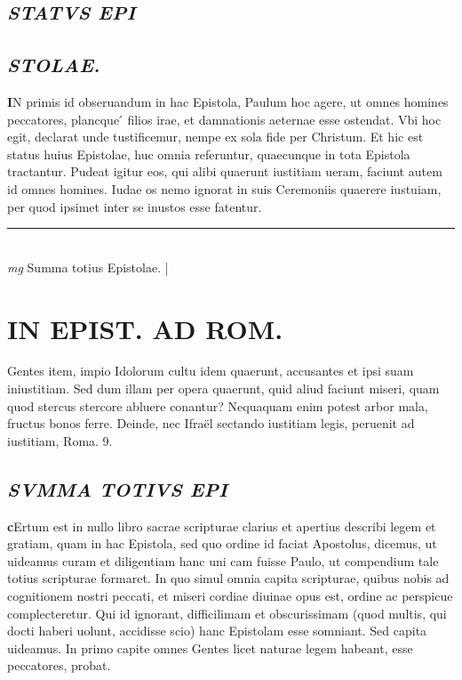 \documentclass{article}
\begin{document}
\begin{pages}
\subsection*{\textit{STATVS EPI}}
{}
\subsection*{\textit{STOLAE.  }}\pstart \huge\textbf{I}\normalsize N primis id obseruandum in hac Epistola, Paulum hoc agere, ut omnes homines peccatores, plancque ́ filios irae, et damnationis aeternae esse ostendat. Vbi hoc egit, declarat unde tustificemur, nempe ex sola fide per Christum. Et hic est status huius Epistolae, huc omnia referuntur, quaecunque in tota Epistola tractantur. Pudeat igitur eos, qui alibi quaerunt iustitiam ueram, faciunt autem id omnes homines. Iudae os nemo ignorat in suis Ceremoniis quaerere iustuiam, per quod ipsimet inter se inustos esse fatentur.  \pend
\vspace{0.5cm}\noindent
\vspace{0.2cm}\rule{1cm}{0.2pt}\\ 
\hspace{0.2cm}\textit{mg}
\footnotesize Summa totius Epistolae. 
\normalsize| 
\section*{IN EPIST. AD ROM.  }
\marginpar{[ p.2 ]}
\marginpar{[ p.1 ]}
\marginpar{[ p.11 ]}\pstart Gentes item, impio Idolorum cultu idem quaerunt, accusantes et ipsi suam iniustitiam. Sed dum illam per opera quaerunt, quid aliud faciunt miseri, quam quod stercus stercore abluere conantur? Nequaquam enim potest arbor mala, fructus bonos ferre. Deinde, nec Ifraël sectando iustitiam legis, peruenit ad iustitiam, Roma. 9.   \pend
{}
{}
\subsection*{\textit{SVMMA TOTIVS EPI}}\pstart \huge\textbf{c}\normalsize Ertum est in nullo libro sacrae scripturae clarius et apertius describi legem et gratiam, quam in hac Epistola, sed quo ordine id faciat Apostolus, dicemus, ut uideamus curam et diligentiam hanc uni cam fuisse Paulo, ut compendium tale totius scripturae formaret. In quo simul omnia capita scripturae, quibus nobis ad cognitionem nostri peccati, et miseri cordiae diuinae opus est, ordine ac perspicue complecteretur. Qui id ignorant, difficilimam et obscurissimam (quod multis, qui docti haberi uolunt, accidisse scio) hanc Epistolam esse somniant. Sed capita uideamus.  In primo capite omnes Gentes licet naturae legem habeant, esse peccatores, probat.   \pend
{}
{}

\end{pages}
\end{document}
